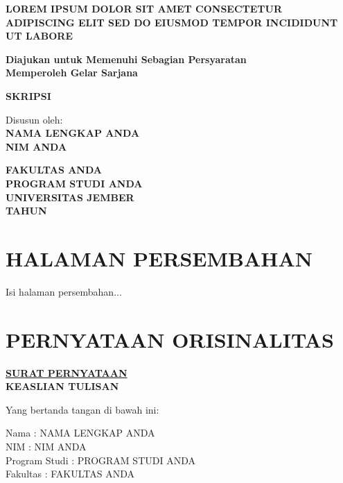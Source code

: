 \documentclass[12pt, a4paper, onecolumn, oneside]{report}
\newcommand{\judul}{LOREM IPSUM DOLOR SIT AMET CONSECTETUR ADIPISCING ELIT SED DO EIUSMOD TEMPOR INCIDIDUNT UT LABORE}
\newcommand{\maksud}{Diajukan untuk Memenuhi Sebagian Persyaratan\\Memperoleh Gelar Sarjana}
\newcommand{\jeniskarya}{SKRIPSI}
\newcommand{\nama}{NAMA LENGKAP ANDA}
\newcommand{\nim}{NIM ANDA}
\newcommand{\prodi}{PROGRAM STUDI ANDA}
\newcommand{\fakultas}{FAKULTAS ANDA}
\newcommand{\tahunterbit}{TAHUN}
\begin{document}
\cleardoublepage
\begin{titlepage}
    \centering
    \vspace*{1cm}
    
    \textbf{\Large \judul} \par
    \vspace{1.5cm}
    
    \textbf{\maksud} \par
    \vspace{1cm}
    
    \textbf{\jeniskarya} \par
    \vspace{1.5cm}
    
    Disusun oleh: \\
    \textbf{\nama} \\
    \textbf{\nim} \par
    \vspace{1.5cm}
    
    \textbf{\fakultas} \\
    \textbf{\prodi} \\
    \textbf{UNIVERSITAS JEMBER} \\
    \textbf{\tahunterbit}
\end{titlepage}

\cleardoublepage
\chapter*{HALAMAN PERSEMBAHAN}
Isi halaman persembahan...

\cleardoublepage
\chapter*{PERNYATAAN ORISINALITAS}
\begin{center}
    \textbf{\underline{SURAT PERNYATAAN}} \\
    \textbf{KEASLIAN TULISAN}
\end{center}

\vspace{1cm}

Yang bertanda tangan di bawah ini:

Nama : \nama \\
NIM : \nim \\
Program Studi : \prodi \\
Fakultas : \fakultas \\
\end{document}

